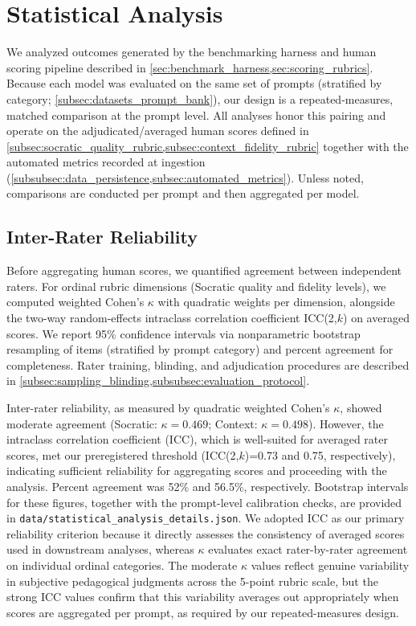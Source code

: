 \section{Statistical Analysis}\label{sec:statistical_analysis}

We analyzed outcomes generated by the benchmarking harness and human scoring pipeline described in \cref{sec:benchmark_harness,sec:scoring_rubrics}. Because each model was evaluated on the same set of prompts (stratified by category; \cref{subsec:datasets_prompt_bank}), our design is a repeated-measures, matched comparison at the prompt level. All analyses honor this pairing and operate on the adjudicated/averaged human scores defined in \cref{subsec:socratic_quality_rubric,subsec:context_fidelity_rubric} together with the automated metrics recorded at ingestion (\cref{subsubsec:data_persistence,subsec:automated_metrics}). Unless noted, comparisons are conducted per prompt and then aggregated per model.

\subsection{Inter-Rater Reliability}\label{subsec:inter_rater_reliability}

Before aggregating human scores, we quantified agreement between independent raters. For ordinal rubric dimensions (Socratic quality and fidelity levels), we computed weighted Cohen's $\kappa$ with quadratic weights per dimension, alongside the two-way random-effects intraclass correlation coefficient ICC(2,$k$) on averaged scores. We report 95\% confidence intervals via nonparametric bootstrap resampling of items (stratified by prompt category) and percent agreement for completeness. Rater training, blinding, and adjudication procedures are described in \cref{subsec:sampling_blinding,subsubsec:evaluation_protocol}. 

Inter-rater reliability, as measured by quadratic weighted Cohen's $\kappa$, showed moderate agreement (Socratic: $\kappa=0.469$; Context: $\kappa=0.498$). However, the intraclass correlation coefficient (ICC), which is well-suited for averaged rater scores, met our preregistered threshold (ICC(2,$k$)=0.73 and 0.75, respectively), indicating sufficient reliability for aggregating scores and proceeding with the analysis. Percent agreement was 52\% and 56.5\%, respectively. Bootstrap intervals for these figures, together with the prompt-level calibration checks, are provided in \verb|data/statistical_analysis_details.json|. We adopted ICC as our primary reliability criterion because it directly assesses the consistency of averaged scores used in downstream analyses, whereas $\kappa$ evaluates exact rater-by-rater agreement on individual ordinal categories. The moderate $\kappa$ values reflect genuine variability in subjective pedagogical judgments across the 5-point rubric scale, but the strong ICC values confirm that this variability averages out appropriately when scores are aggregated per prompt, as required by our repeated-measures design.

